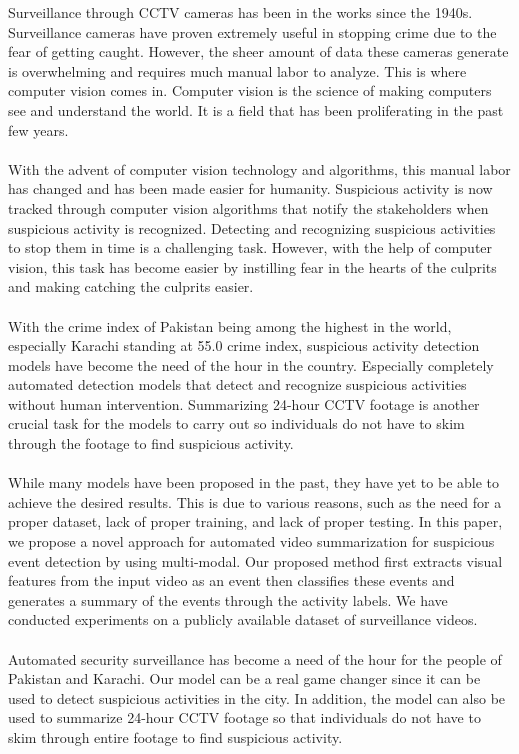 \documentclass[title page]{article}
\begin{document}
Surveillance through CCTV cameras has been in the works since the 1940s. Surveillance cameras have proven extremely useful in stopping crime due to the fear of getting caught. However, the sheer amount of data these cameras generate is overwhelming and requires much manual labor to analyze. This is where computer vision comes in. Computer vision is the science of making computers see and understand the world. It is a field that has been proliferating in the past few years. 
\\ \\
With the advent of computer vision technology and algorithms, this manual labor has changed and has been made easier for humanity. Suspicious activity is now tracked through computer vision algorithms that notify the stakeholders when suspicious activity is recognized. Detecting and recognizing suspicious activities to stop them in time is a challenging task. However, with the help of computer vision, this task has become easier by instilling fear in the hearts of the culprits and making catching the culprits easier.
\\ \\
With the crime index of Pakistan being among the highest in the world, especially Karachi standing at 55.0 crime index, suspicious activity detection models have become the need of the hour in the country. Especially completely automated detection models that detect and recognize suspicious activities without human intervention. Summarizing 24-hour CCTV footage is another crucial task for the models to carry out so individuals do not have to skim through the footage to find suspicious activity.
\\ \\
While many models have been proposed in the past, they have yet to be able to achieve the desired results. This is due to various reasons, such as the need for a proper dataset, lack of proper training, and lack of proper testing. In this paper, we propose a novel approach for automated video summarization for suspicious event detection by using multi-modal. Our proposed method first extracts visual features from the input video as an event then classifies these events and generates a summary of the events through the activity labels. We have conducted experiments on a publicly available dataset of surveillance videos. 
\\ \\
Automated security surveillance has become a need of the hour for the people of Pakistan and Karachi. Our model can be a real game changer since it can be used to detect suspicious activities in the city. In addition, the model can also be used to summarize 24-hour CCTV footage so that individuals do not have to skim through entire footage to find suspicious activity.
\end{document}
